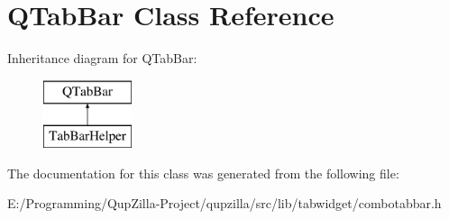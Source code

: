 \hypertarget{class_q_tab_bar}{
\section{QTabBar Class Reference}
\label{class_q_tab_bar}
}
Inheritance diagram for QTabBar:\begin{figure}[H]
\begin{center}
\leavevmode
\includegraphics[height=2cm]{class_q_tab_bar}
\end{center}
\end{figure}


The documentation for this class was generated from the following file:\begin{DoxyCompactItemize}
\item 
E:/Programming/QupZilla-\/Project/qupzilla/src/lib/tabwidget/combotabbar.h\end{DoxyCompactItemize}

